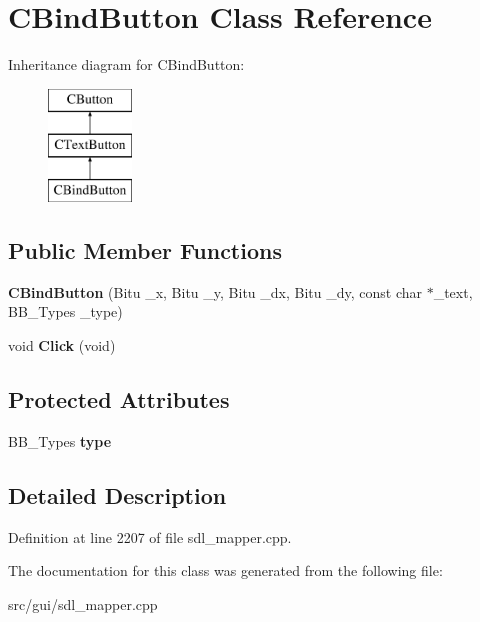 \hypertarget{classCBindButton}{\section{C\-Bind\-Button Class Reference}
\label{classCBindButton}
}
Inheritance diagram for C\-Bind\-Button\-:\begin{figure}[H]
\begin{center}
\leavevmode
\includegraphics[height=3.000000cm]{classCBindButton}
\end{center}
\end{figure}
\subsection*{Public Member Functions}
\begin{DoxyCompactItemize}
\item 
\hypertarget{classCBindButton_ac88961b71a1666452f4d848f851259d9}{{\bfseries C\-Bind\-Button} (Bitu \-\_\-x, Bitu \-\_\-y, Bitu \-\_\-dx, Bitu \-\_\-dy, const char $\ast$\-\_\-text, B\-B\-\_\-\-Types \-\_\-type)}\label{classCBindButton_ac88961b71a1666452f4d848f851259d9}

\item 
\hypertarget{classCBindButton_a62e84c58b256b4b9f82d6ad1ca32be45}{void {\bfseries Click} (void)}\label{classCBindButton_a62e84c58b256b4b9f82d6ad1ca32be45}

\end{DoxyCompactItemize}
\subsection*{Protected Attributes}
\begin{DoxyCompactItemize}
\item 
\hypertarget{classCBindButton_a6d3fe3711c3f57f5e2ec7a2311408795}{B\-B\-\_\-\-Types {\bfseries type}}\label{classCBindButton_a6d3fe3711c3f57f5e2ec7a2311408795}

\end{DoxyCompactItemize}


\subsection{Detailed Description}


Definition at line 2207 of file sdl\-\_\-mapper.\-cpp.



The documentation for this class was generated from the following file\-:\begin{DoxyCompactItemize}
\item 
src/gui/sdl\-\_\-mapper.\-cpp\end{DoxyCompactItemize}
